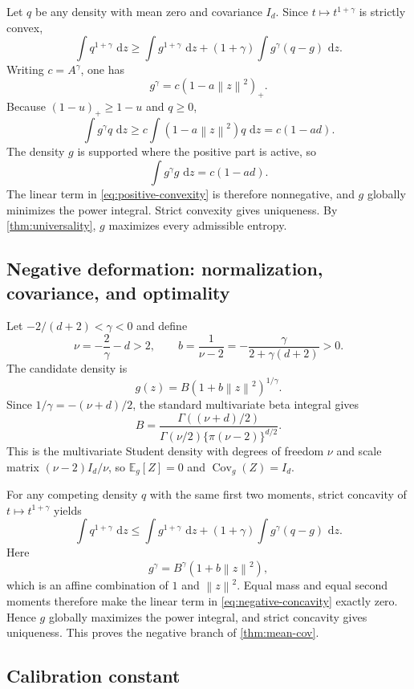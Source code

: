 \documentclass[pdflatex,sn-mathphys-num]{sn-jnl}
\theoremstyle{thmstyleone}
\theoremstyle{thmstyletwo}
\theoremstyle{thmstylethree}
\DeclareMathOperator{\Cov}{Cov}
\newcommand{\dd}{\,\mathrm{d}}
\newcommand{\E}{\mathbb{E}}
\newcommand{\norm}[1]{\left\lVert #1\right\rVert}
\begin{document}
Let $q$ be any density with mean zero and covariance $I_d$. Since $t\mapsto t^{1+\gamma}$ is strictly convex,
\begin{equation}
 \int q^{1+\gamma}\,\dd z
 \geq
 \int g^{1+\gamma}\,\dd z
 +(1+\gamma)\int g^\gamma(q-g)\,\dd z.
\label{eq:positive-convexity}
\end{equation}
Writing $c=A^\gamma$, one has
\[
 g^\gamma=c(1-a\norm{z}^2)_+.
\]
Because $(1-u)_+\geq1-u$ and $q\geq0$,
\[
 \int g^\gamma q\,\dd z
 \geq
 c\int(1-a\norm{z}^2)q\,\dd z
 =c(1-ad).
\]
The density $g$ is supported where the positive part is active, so
\[
 \int g^\gamma g\,\dd z=c(1-ad).
\]
The linear term in \cref{eq:positive-convexity} is therefore nonnegative, and $g$ globally minimizes the power integral. Strict convexity gives uniqueness. By \cref{thm:universality}, $g$ maximizes every admissible entropy.

\subsection{Negative deformation: normalization, covariance, and optimality}\label{app:negative-proof}

Let $-2/(d+2)<\gamma<0$ and define
\[
 \nu=-\frac{2}{\gamma}-d>2,
 \qquad
 b=\frac{1}{\nu-2}
 =-\frac{\gamma}{2+\gamma(d+2)}>0.
\]
The candidate density is
\[
 g(z)=B(1+b\norm{z}^2)^{1/\gamma}.
\]
Since $1/\gamma=-(\nu+d)/2$, the standard multivariate beta integral gives
\[
 B=
 \frac{\Gamma((\nu+d)/2)}
 {\Gamma(\nu/2)\{\pi(\nu-2)\}^{d/2}}.
\]
This is the multivariate Student density with degrees of freedom $\nu$ and scale matrix $(\nu-2)I_d/\nu$, so $\E_g[Z]=0$ and $\Cov_g(Z)=I_d$.

For any competing density $q$ with the same first two moments, strict concavity of $t\mapsto t^{1+\gamma}$ yields
\begin{equation}
 \int q^{1+\gamma}\,\dd z
 \leq
 \int g^{1+\gamma}\,\dd z
 +(1+\gamma)\int g^\gamma(q-g)\,\dd z.
\label{eq:negative-concavity}
\end{equation}
Here
\[
 g^\gamma=B^\gamma(1+b\norm{z}^2),
\]
which is an affine combination of $1$ and $\norm{z}^2$. Equal mass and equal second moments therefore make the linear term in \cref{eq:negative-concavity} exactly zero. Hence $g$ globally maximizes the power integral, and strict concavity gives uniqueness. This proves the negative branch of \cref{thm:mean-cov}.

\subsection{Calibration constant}\label{app:calibration-constant}
\end{document}

